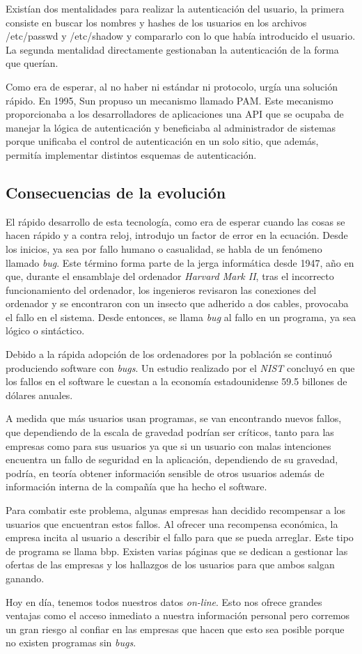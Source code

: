 \documentclass[titlepage, 12pt, a4paper]{article}
\begin{document}
Existían dos mentalidades para realizar la autenticación del usuario, la primera consiste en buscar los nombres y hashes de los usuarios en los archivos /etc/passwd y /etc/shadow y compararlo con lo que había introducido el usuario. La segunda mentalidad directamente gestionaban la autenticación de la forma que querían. \par
Como era de esperar, al no haber ni estándar ni protocolo, urgía una solución rápido. En 1995, \Gls{Sun} propuso un mecanismo llamado \Gls{PAM}. Este mecanismo proporcionaba a los desarrolladores de aplicaciones una \Gls{API} que se ocupaba de manejar la lógica de autenticación y beneficiaba al administrador de sistemas porque unificaba el control de autenticación en un solo sitio, que además, permitía implementar distintos esquemas de autenticación.
\subsection{Consecuencias de la evolución}
El rápido desarrollo de esta tecnología, como era de esperar cuando las cosas se hacen rápido y a contra reloj, introdujo un factor de error en la ecuación. Desde los inicios, ya sea por fallo humano o casualidad, se habla de un fenómeno llamado \textit{\Gls{bug}}. Este término forma parte de la jerga informática desde 1947, año en que, durante el ensamblaje del ordenador \textit{Harvard Mark II}, tras el incorrecto funcionamiento del ordenador, los ingenieros revisaron las conexiones del ordenador y se encontraron con un insecto que adherido a dos cables, provocaba el fallo en el sistema. Desde entonces, se llama \textit{\Gls{bug}} al fallo en un programa, ya sea lógico o sintáctico.\par Debido a la rápida adopción de los ordenadores por la población se continuó produciendo software con \textit{\Gls{bug}s}. Un estudio realizado por el \textit{\Gls{NIST}} concluyó en que los fallos en el software le cuestan a la economía estadounidense 59.5 billones de dólares anuales.\cite{NIST}\par A medida que más usuarios usan programas, se van encontrando nuevos fallos, que dependiendo de la escala de gravedad podrían ser críticos, tanto para las empresas como para sus usuarios ya que si un usuario con malas intenciones encuentra un fallo de seguridad en la aplicación, dependiendo de su gravedad, podría, en teoría obtener información sensible de otros usuarios además de información interna de la compañía que ha hecho el software.\par Para combatir este problema, algunas empresas han decidido recompensar a los usuarios que encuentran estos fallos. Al ofrecer una recompensa económica, la empresa incita al usuario a describir el fallo para que se pueda arreglar. Este tipo de programa se llama \Gls{bbp}. Existen varias páginas que se dedican a gestionar las ofertas de las empresas y los hallazgos de los usuarios para que ambos salgan ganando.\par Hoy en día, tenemos todos nuestros datos \textit{on-line}. Esto nos ofrece grandes ventajas como el acceso inmediato a nuestra información personal pero corremos un gran riesgo al confiar en las empresas que hacen que esto sea posible porque no existen programas sin  \textit{\Gls{bug}s}.
\end{document}
